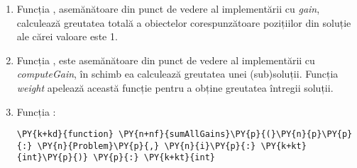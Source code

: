 \begin{sloppypar}
\begin{enumerate}
\begin{Verbatim}[commandchars=\\\{\}]
  \PY{k}{requires} \PY{n}{hasAllowedValues}\PY{p}{(}\PY{n}{solution}\PY{p}{)}
  \PY{k}{requires} \PY{l+m+mi}{0} \PY{o}{\PYZlt{}=} \PY{o}{|}\PY{n}{solution}\PY{o}{|} \PY{o}{\PYZlt{}=} \PY{o}{|}\PY{n}{p}\PY{p}{.}\PY{n}{gains}\PY{o}{|}
  \PY{k}{ensures} \PY{n}{computeGain}\PY{p}{(}\PY{n}{p}\PY{p}{,} \PY{n}{solution}\PY{p}{,} \PY{n}{i}\PY{p}{)} \PY{o}{\PYZgt{}=} \PY{l+m+mi}{0}
\PY{p}{\PYZob{}}
  \PY{k}{if} \PY{n}{i} \PY{o}{==} \PY{l+m+mi}{0} \PY{k}{then} \PY{n}{solution}\PY{p}{[}\PY{l+m+mi}{0}\PY{p}{]} \PY{o}{*} \PY{n}{p}\PY{p}{.}\PY{n}{gains}\PY{p}{[}\PY{l+m+mi}{0}\PY{p}{]} \PY{k}{else} 
  \PY{n}{solution}\PY{p}{[}\PY{n}{i}\PY{p}{]} \PY{o}{*} \PY{n}{p}\PY{p}{.}\PY{n}{gains}\PY{p}{[}\PY{n}{i}\PY{p}{]} \PY{o}{+} \PY{n}{computeGain}\PY{p}{(}\PY{n}{p}\PY{p}{,} \PY{n}{solution}\PY{p}{,} \PY{n}{i} \PY{o}{\PYZhy{}} \PY{l+m+mi}{1}\PY{p}{)}
\PY{p}{\PYZcb{}}
\end{Verbatim}
    Spre deosebire de \textit{gain}, poate primi o subsoluție al cărui profit se dorește a fi calculat prin specificarea unui index $i$ reprezentând poziția de la final spre început a subsoluției și are o implementare recursivă a cărei finalitate este asigurată prin condiția $i == 0$. Această funcție oferă o informație în plus care nu reiese direct din definiția funcției, dar este adevărată, mai exact faptul că la finalul execuției rezultatul obținut va fi mereu pozitiv sau egal cu zero. Acest lucru este specificat folosind clauza \texttt{ensures}, iar adnotările de acest gen sunt numite  . Ele sunt expresii logice care trebuie să fie adevărate după executarea logicii unei funcții, metode sau leme. \cite{DBLP:series/natosec/KoenigL12}
    \item Funcția , asemănătoare din punct de vedere al implementării cu \textit{gain}, calculează greutatea totală a obiectelor corespunzătoare pozițiilor din soluție ale cărei valoare este 1.
    \item Funcția , este asemănătoare din punct de vedere al implementării cu \textit{computeGain}, în schimb ea calculează greutatea unei (sub)soluții. Funcția \textit{weight} apelează această funcție pentru a obține greutatea întregii soluții.
    \item Funcția :
    \begin{Verbatim}[commandchars=\\\{\}]
\PY{k+kd}{function} \PY{n+nf}{sumAllGains}\PY{p}{(}\PY{n}{p}\PY{p}{:} \PY{n}{Problem}\PY{p}{,} \PY{n}{i}\PY{p}{:} \PY{k+kt}{int}\PY{p}{)} \PY{p}{:} \PY{k+kt}{int}

\end{Verbatim}
\end{enumerate}
\end{sloppypar}
